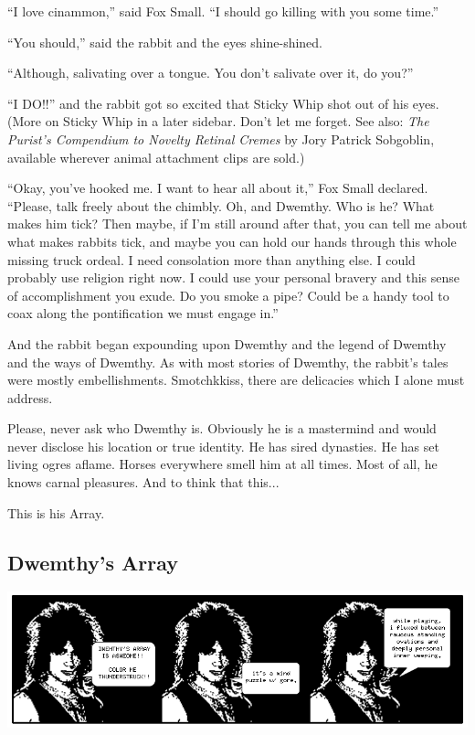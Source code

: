 \documentclass[10pt,twoside]{report}
\begin{document}
``I love cinammon,'' said Fox Small.  ``I should go killing with you
some time.''

``You should,'' said the rabbit and the eyes shine-shined.

``Although, salivating over a tongue.  You don't salivate over it, do
you?''

``I DO!!'' and the rabbit got so excited that Sticky Whip shot out of
his eyes.  (More on Sticky Whip in a later sidebar. Don't let me
forget.  See also: {\em The Purist's Compendium to Novelty Retinal
  Cremes} by Jory Patrick Sobgoblin, available wherever animal
attachment clips are sold.)

``Okay, you've hooked me.  I want to hear all about it,'' Fox Small
declared. ``Please, talk freely about the chimbly.  Oh, and Dwemthy.
Who is he?  What makes him tick?  Then maybe, if I'm still around
after that, you can tell me about what makes rabbits tick, and maybe
you can hold our hands through this whole missing truck ordeal. I need
consolation more than anything else.  I could probably use religion
right now.  I could use your personal bravery and this sense of
accomplishment you exude.  Do you smoke a pipe?  Could be a handy tool
to coax along the pontification we must engage in.''

And the rabbit began expounding upon Dwemthy and the legend of Dwemthy
and the ways of Dwemthy. As with most stories of Dwemthy, the rabbit's
tales were mostly embellishments. Smotchkkiss, there are delicacies
which I alone must address.

Please, never ask who Dwemthy is. Obviously he is a mastermind and
would never disclose his location or true identity. He has sired
dynasties. He has set living ogres aflame. Horses everywhere smell him
at all times. Most of all, he knows carnal pleasures. And to think
that this...

This is his Array.



\subsection{Dwemthy's Array}



	\includegraphics[width=1.0\textwidth]{cache/62.png}
\end{document}
